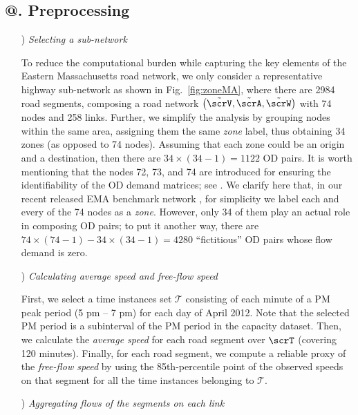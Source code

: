 \documentclass[3p]{elsarticle}
\makeatletter
\newcommand{\rmnum}[1]{\romannumeral #1}
\newcommand{\Rmnum}[1]{\expandafter\@slowromancap\romannumeral #1@}
\makeatother
\begin{document}
\subsection*{\Rmnum{2}. Preprocessing} \label{prep}

\begin{itemize}

	
	\item[\rmnum{1})] \textit{Selecting a sub-network} \label{sec:sele}
	
	To reduce the computational burden while capturing the key elements of the
	Eastern Massachusetts road network, we only consider a representative
	highway sub-network as shown in Fig.~\ref{fig:zoneMA}, where there
	are 2984 road segments, composing a road network $\big( {\tilde {\scrV},\tilde {\scrA}}, \tilde {\scrW} \big)$ with 74 nodes and 258 links. 
	Further, we simplify the analysis by grouping nodes within the same area, assigning them the same \emph{zone} label, thus obtaining 34 zones (as opposed to 74 nodes). Assuming that each zone could be an origin and a destination, then there are $34 \times (34-1) = 1122$ OD pairs. It is worth mentioning that the nodes 72, 73, and 74 are introduced for ensuring the identifiability of the OD demand matrices; see \cite[Lemma 2]{hazelton2000estimation}. We clarify here that, in our recent released EMA benchmark network \cite{BarGera16}, for simplicity we label each and every of the 74 nodes as a \emph{zone}. However, only 34 of them play an actual role in composing OD pairs; to put it another way, there are $74 \times (74 - 1) - 34 \times (34 - 1) = 4280$ ``fictitious'' OD pairs whose flow demand is zero.
	
	\item[\rmnum{2})] \textit{Calculating average speed and free-flow speed} \label{sec:upda}

First, we select a time instances set $\mathcal{T}$ consisting of each
minute of a PM peak period (5 pm -- 7 pm) for each day of April
2012. Note that the selected PM period is a subinterval of
the PM period in the capacity dataset. Then, we calculate
the \textit{average speed} for each road segment over $\scrT$ (covering 120 minutes).  Finally, for each road segment, we compute a reliable
proxy of the \textit{free-flow speed} by using the 85th-percentile point of the
observed speeds on that segment for all the time instances belonging to
$\mathcal{T}$.
	
	\item[\rmnum{3})]	\textit{Aggregating flows of the segments on each link} \label{sec:aggre}


\end{itemize}
\end{document}
